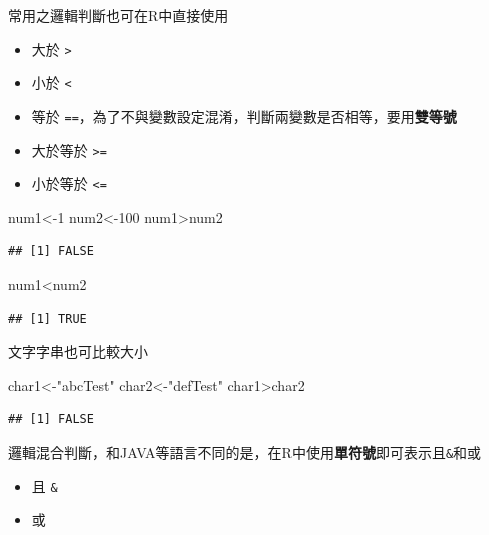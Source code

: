 \documentclass[]{book}
\newenvironment{Shaded}{\begin{snugshade}}{\end{snugshade}}
\newcommand{\DecValTok}[1]{\textcolor[rgb]{0.00,0.00,0.81}{{#1}}}
\newcommand{\StringTok}[1]{\textcolor[rgb]{0.31,0.60,0.02}{{#1}}}
\newcommand{\NormalTok}[1]{{#1}}
\providecommand{\tightlist}{%
  \setlength{\itemsep}{0pt}\setlength{\parskip}{0pt}}
\theoremstyle{definition}
\theoremstyle{definition}
\theoremstyle{remark}
\begin{document}
常用之邏輯判斷也可在R中直接使用

\begin{itemize}
\tightlist
\item
  大於 \texttt{\textgreater{}}
\item
  小於 \texttt{\textless{}}
\item
  等於
  \texttt{==}，為了不與變數設定混淆，判斷兩變數是否相等，要用\textbf{雙等號}
\item
  大於等於 \texttt{\textgreater{}=}
\item
  小於等於 \texttt{\textless{}=}
\end{itemize}

\begin{Shaded}
\begin{Highlighting}[]
\NormalTok{num1<-}\DecValTok{1}
\NormalTok{num2<-}\DecValTok{100}
\NormalTok{num1>num2}
\end{Highlighting}
\end{Shaded}

\begin{verbatim}
## [1] FALSE
\end{verbatim}

\begin{Shaded}
\begin{Highlighting}[]
\NormalTok{num1<num2}
\end{Highlighting}
\end{Shaded}

\begin{verbatim}
## [1] TRUE
\end{verbatim}

文字字串也可比較大小

\begin{Shaded}
\begin{Highlighting}[]
\NormalTok{char1<-}\StringTok{"abcTest"} 
\NormalTok{char2<-}\StringTok{"defTest"}
\NormalTok{char1>char2}
\end{Highlighting}
\end{Shaded}

\begin{verbatim}
## [1] FALSE
\end{verbatim}

邏輯混合判斷，和JAVA等語言不同的是，在R中使用\textbf{單符號}即可表示且\texttt{\&}和或\texttt{\textbar{}}

\begin{itemize}
\tightlist
\item
  且 \texttt{\&}
\item
  或 \texttt{\textbar{}}
\end{itemize}
\end{document}
